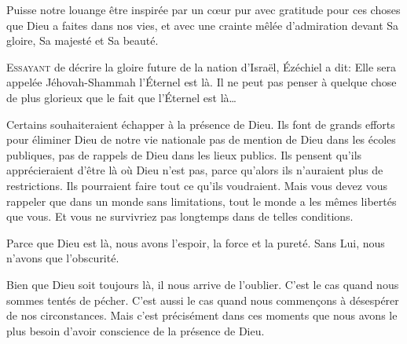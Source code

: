 Puisse notre louange être inspirée par un c\oe{}ur pur
 \ocadr avec gratitude pour ces choses que Dieu a faites dans nos vies, 
et avec une crainte mêlée d'admiration devant Sa gloire,
 Sa majesté et Sa beauté. 

\dvrule







\lettrine{E}{ssayant} de décrire la gloire future de la nation d'Israël,
 Ézéchiel a dit: 
 \Og Elle sera appelée Jéhovah-Shammah \ocadr l'Éternel est là. \Fg{}
 Il ne peut pas penser à quelque chose de plus glorieux
 que le fait que l'Éternel est là\dots{}

Certains souhaiteraient échapper à la présence de Dieu.
 Ils font de grands efforts pour éliminer Dieu de notre vie nationale
 \ocadr pas de mention de Dieu dans les écoles publiques,
 pas de rappels de Dieu dans les lieux publics.
 Ils pensent qu'ils apprécieraient d'être là où Dieu n'est pas,
 parce qu'alors ils n'auraient plus de restrictions.
 Ils pourraient faire tout ce qu'ils voudraient.
 Mais vous devez vous rappeler que dans un monde sans limitations,
 tout le monde a les mêmes libertés que vous.
 Et vous ne survivriez pas longtemps dans de telles conditions. 


Parce que Dieu est là, nous avons l'espoir, la force et la pureté.
 Sans Lui, nous n'avons que l'obscurité. 

Bien que Dieu soit toujours là, il nous arrive de l'oublier.
 C'est le cas quand nous sommes tentés de pécher.
 C'est aussi le cas quand nous commen\c{c}ons à désespérer de nos circonstances.
 Mais c'est précisément dans ces moments que nous avons le plus besoin
 d'avoir conscience de la présence de Dieu. 

